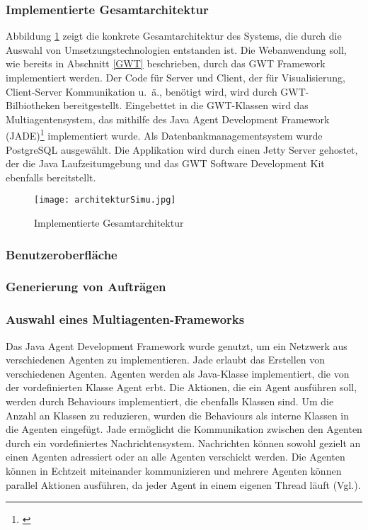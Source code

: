 \subsubsection{Implementierte Gesamtarchitektur}
Abbildung \ref{GAI} zeigt die konkrete Gesamtarchitektur des Systems, die durch die Auswahl von Umsetzungstechnologien entstanden ist. Die Webanwendung soll, wie bereits in Abschnitt \ref{GWT} beschrieben, durch das GWT Framework implementiert werden. Der Code für Server und Client, der für Visualisierung, Client-Server Kommunikation u.~ä., benötigt wird, wird durch GWT-Bilbiotheken bereitgestellt. Eingebettet in die GWT-Klassen wird das Multiagentensystem, das mithilfe des Java Agent Development Framework (JADE)\footnote{\cite{jade}} implementiert wurde. Als Datenbankmanagementsystem wurde PostgreSQL ausgewählt. Die Applikation wird durch einen Jetty Server gehostet, der die Java Laufzeitumgebung und das GWT Software Development Kit ebenfalls bereitstellt.  
\begin{figure}[h!]
	\centering
		\texttt{[image: architekturSimu.jpg]}        
		\caption{Implementierte Gesamtarchitektur}
	\label{GAI}
\end{figure}
\subsubsection{Benutzeroberfläche}
\subsubsection{Generierung von Aufträgen}
\subsubsection{Auswahl eines Multiagenten-Frameworks}
Das Java Agent Development Framework wurde genutzt, um ein Netzwerk aus verschiedenen Agenten zu implementieren. Jade erlaubt das Erstellen von verschiedenen Agenten. Agenten werden als Java-Klasse implementiert, die von der vordefinierten Klasse Agent erbt. Die Aktionen, die ein Agent ausführen soll, werden durch Behaviours implementiert, die ebenfalls Klassen sind. Um die Anzahl an Klassen zu reduzieren, wurden die Behaviours als interne Klassen in die Agenten eingefügt. Jade ermöglicht die Kommunikation zwischen den Agenten durch ein vordefiniertes Nachrichtensystem. Nachrichten können sowohl gezielt an einen Agenten adressiert oder an alle Agenten verschickt werden. Die Agenten können in Echtzeit miteinander kommunizieren und mehrere Agenten können parallel Aktionen ausführen, da jeder Agent in einem eigenen Thread läuft (Vgl.\cite{jadetwo}). 
